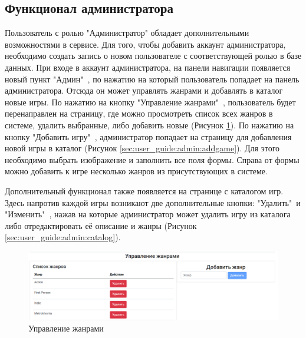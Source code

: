 \subsection{Функционал администратора} 
\label{sec:user_guide:admin}

Пользователь с ролью "Администратор" обладает дополнительными возможностями в сервисе. Для того, чтобы добавить аккаунт администратора,
необходимо создать запись о новом пользователе с соответствующей ролью в базе данных. При входе в аккаунт администратора, на панели
навигации появляется новый пункт "Админ"\ , по нажатию на который пользователь попадает на панель администратора. Отсюда он может управлять
жанрами и добавлять в каталог новые игры. По нажатию на кнопку "Управление жанрами"\ , пользователь будет перенаправлен на страницу, где
можно просмотреть список всех жанров в системе, удалить выбранные, либо добавить новые (Рисунок \ref*{sec:user_guide:admin:genres}).
По нажатию на кнопку "Добавить игру"\ , администратор попадает на страницу для добавления новой игры в каталог (Рисунок \ref*{sec:user_guide:admin:addgame}).
Для этого необходимо выбрать изображение и заполнить все поля формы. Справа от формы можно добавить к игре несколько жанров из присутствующих
в системе.

Дополнительный функционал также появляется на странице с каталогом игр. Здесь напротив каждой игры возникают две дополнительные кнопки:
"Удалить"\ и "Изменить"\ , нажав на которые администратор может удалить игру из каталога либо отредактировать её описание и жанры (Рисунок \ref*{sec:user_guide:admin:catalog}).

\begin{figure}[ht]
	\centering
	  \includegraphics[scale=0.4]{attachments/genres.png}  
	  \caption{ Управление жанрами }
	  \label{sec:user_guide:admin:genres}
\end{figure}

